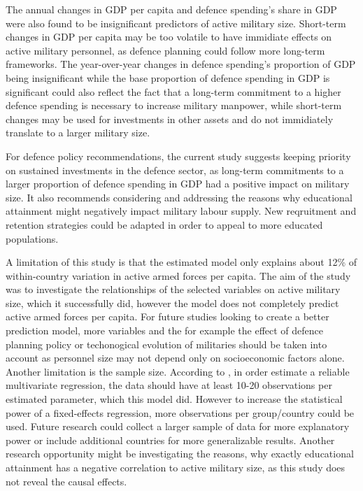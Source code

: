 The annual changes in GDP per capita and defence spending's share in GDP were also found to be 
insignificant predictors of active military size. Short-term changes in GDP per capita may be 
too volatile to have immidiate effects on active military personnel, as defence planning could 
follow more long-term frameworks. The year-over-year changes in defence spending's proportion 
of GDP being insignificant while the base proportion of defence spending in GDP is significant 
could also reflect the fact that a long-term commitment to a higher defence spending is 
necessary to increase military manpower, while short-term changes may be used for
investments in other assets and do not immidiately translate to a larger military size.

For defence policy recommendations, the current study suggests keeping priority on sustained 
investments in the defence sector, as long-term commitments to a larger proportion of defence 
spending in GDP had a positive impact on military size. It also recommends considering and 
addressing the reasons why educational attainment might negatively impact military labour supply. 
New reqruitment and retention strategies could be adapted in order to appeal to more educated 
populations.

A limitation of this study is that the estimated model only explains about 12\% of within-country 
variation in active armed forces per capita. 
The aim of the study was to investigate the relationships of the selected variables on 
active military size, which it successfully did, however the model does not completely predict 
active armed forces per capita. For future studies looking to create a better prediction model, 
more variables and the for example the effect of defence planning policy or techonogical evolution of militaries 
should be taken into account as 
personnel size may not depend only on socioeconomic factors alone.
Another limitation is the sample size. According to \textcite{harrell_multivariable_2015},
in order estimate a reliable multivariate regression, the data should have at least 
10-20 observations per estimated parameter, which this model did. 
However to increase the statistical 
power of a fixed-effects regression, more observations per group/country could be used.
Future research could collect a larger sample of data for more explanatory power or 
include additional countries for more generalizable results.
Another research opportunity might be investigating the reasons, why exactly educational 
attainment has a negative correlation to active military size, as this study does not reveal 
the causal effects.

